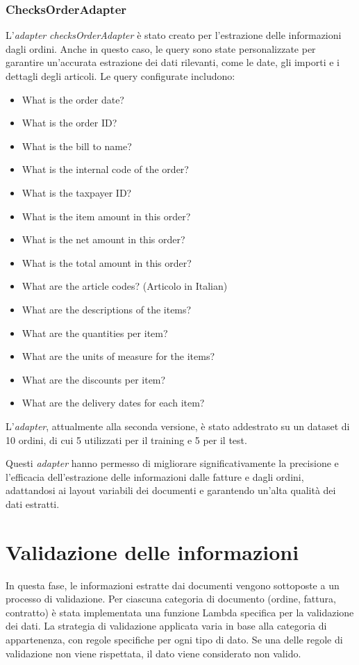 \subsubsection{ChecksOrderAdapter}
L'\textit{adapter} \textit{checksOrderAdapter} è stato creato per l'estrazione delle informazioni dagli ordini. Anche in questo caso, le query sono state personalizzate per garantire un'accurata estrazione dei dati rilevanti, come le date, gli importi e i dettagli degli articoli. Le query configurate includono:

\begin{itemize}
    \item What is the order date?
    \item What is the order ID?
    \item What is the bill to name?
    \item What is the internal code of the order?
    \item What is the taxpayer ID?
    \item What is the item amount in this order?
    \item What is the net amount in this order?
    \item What is the total amount in this order?
    \item What are the article codes? (Articolo in Italian)
    \item What are the descriptions of the items?
    \item What are the quantities per item?
    \item What are the units of measure for the items?
    \item What are the discounts per item?
    \item What are the delivery dates for each item?
\end{itemize}

L'\textit{adapter}, attualmente alla seconda versione, è stato addestrato su un dataset di 10 ordini, di cui 5 utilizzati per il training e 5 per il test.

Questi \textit{adapter} hanno permesso di migliorare significativamente la precisione e l'efficacia dell'estrazione delle informazioni dalle fatture e dagli ordini, adattandosi ai layout variabili dei documenti e garantendo un'alta qualità dei dati estratti.
\section{Validazione delle informazioni}
In questa fase, le informazioni estratte dai documenti vengono sottoposte a un processo di validazione. Per ciascuna categoria di documento (ordine, fattura, contratto) è stata implementata una funzione Lambda specifica per la validazione dei dati. La strategia di validazione applicata varia in base alla categoria di appartenenza, con regole specifiche per ogni tipo di dato. Se una delle regole di validazione non viene rispettata, il dato viene considerato non valido.

